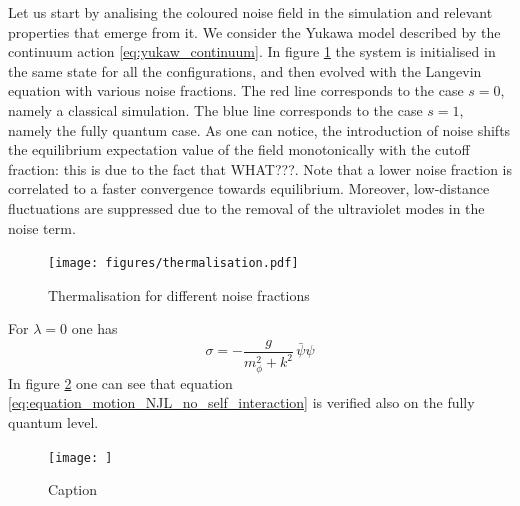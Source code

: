 Let us start by analising the coloured noise field in the simulation and relevant properties that emerge from it. We consider the Yukawa model described by the continuum action \ref{eq:yukaw_continuum}.
In figure \ref{fig:thermalisation_different_noise_fracs} the system is initialised in the same state for all the configurations, and then evolved with the Langevin equation with various noise fractions. The red line corresponds to the case $s=0$, namely a classical simulation. The blue line corresponds to the case $s=1$, namely the fully quantum case. As one can notice, the introduction of noise shifts the equilibrium expectation value of the field monotonically with the cutoff fraction: this is due to the fact that WHAT???. Note that a lower noise fraction is correlated to a faster convergence towards equilibrium. Moreover, low-distance fluctuations are suppressed due to the removal of the ultraviolet modes in the noise term.
\begin{figure}
    \centering
    \texttt{[image: figures/thermalisation.pdf]}
    \caption{Thermalisation for different noise fractions}
    \label{fig:thermalisation_different_noise_fracs}
\end{figure}

For $\lambda = 0$ one has
\begin{equation}
    \sigma = -\frac{g}{m_\phi^2 + k^2} \, \bar\psi \psi
    \label{eq:equation_motion_NJL_no_self_interaction}
\end{equation}
In figure \ref{fig:equation_motion_NJL} one can see that equation \eqref{eq:equation_motion_NJL_no_self_interaction} is verified also on the fully quantum level.
\begin{figure}
    \centering
    \texttt{[image: ]}
    \caption{Caption}
    \label{fig:equation_motion_NJL}
\end{figure}


